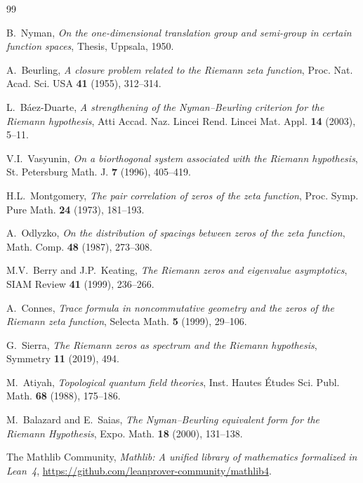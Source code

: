 \documentclass[11pt,a4paper]{article}
\begin{document}
\begin{thebibliography}{99}

B.~Nyman, \emph{On the one-dimensional translation group and semi-group in
certain function spaces}, Thesis, Uppsala, 1950.

A.~Beurling, \emph{A closure problem related to the Riemann zeta function},
Proc. Nat. Acad. Sci. USA \textbf{41} (1955), 312--314.

L.~B\'aez-Duarte, \emph{A strengthening of the Nyman--Beurling criterion for
the Riemann hypothesis}, Atti Accad. Naz. Lincei Rend. Lincei Mat. Appl.
\textbf{14} (2003), 5--11.

V.I.~Vasyunin, \emph{On a biorthogonal system associated with the Riemann
hypothesis}, St. Petersburg Math. J. \textbf{7} (1996), 405--419.

H.L.~Montgomery, \emph{The pair correlation of zeros of the zeta function},
Proc. Symp. Pure Math. \textbf{24} (1973), 181--193.

A.~Odlyzko, \emph{On the distribution of spacings between zeros of the zeta
function}, Math. Comp. \textbf{48} (1987), 273--308.

M.V.~Berry and J.P.~Keating, \emph{The Riemann zeros and eigenvalue
asymptotics}, SIAM Review \textbf{41} (1999), 236--266.

A.~Connes, \emph{Trace formula in noncommutative geometry and the zeros of
the Riemann zeta function}, Selecta Math. \textbf{5} (1999), 29--106.

G.~Sierra, \emph{The Riemann zeros as spectrum and the Riemann hypothesis},
Symmetry \textbf{11} (2019), 494.

M.~Atiyah, \emph{Topological quantum field theories}, Inst. Hautes \'Etudes
Sci. Publ. Math. \textbf{68} (1988), 175--186.

M.~Balazard and E.~Saias, \emph{The Nyman--Beurling equivalent form for the
Riemann Hypothesis}, Expo. Math. \textbf{18} (2000), 131--138.

The Mathlib Community, \emph{Mathlib: A unified library of mathematics
formalized in Lean~4}, \url{https://github.com/leanprover-community/mathlib4}.

\end{thebibliography}
\end{document}
